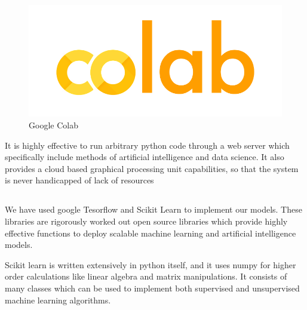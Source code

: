 \documentclass[12pt]{article}
\newcommand{\nd}{\noindent}
\newcommand{\subsize}{\fontsize{14pt}{12pt}\selectfont}
\begin{document}
\begin{center}
\begin{figure}[h]
\centerline{\includegraphics[scale=.45]{colab2.png}}
\caption{Google Colab}
\end{figure}
\end{center}
 

\nd It is highly effective to run arbitrary python code through a web server which specifically include methods of artificial intelligence and data science. It also provides a cloud based graphical processing unit capabilities, so that the system is never handicapped of lack of resources
\newpage
\subsection{\textbf{\subsize{LIBRARIES AND DEPENDENCIES}}}
We have used google Tesorflow and Scikit Learn to implement our models. These libraries are rigorously worked out open source libraries which provide highly effective functions to deploy scalable machine learning and artificial intelligence models. 

\nd Scikit learn is written extensively in python itself, and it uses numpy for higher order calculations like linear algebra and matrix manipulations. It consists of many classes which can be used to implement both supervised and unsupervised machine learning algorithms. 
\vspace{10mm}
\end{document}
